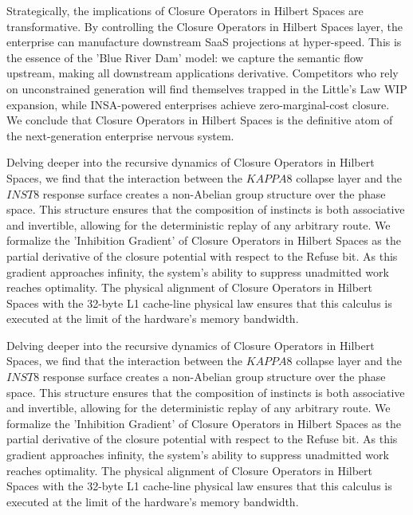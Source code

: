 \documentclass[12pt,a4paper,oneside]{book}
\begin{document}
Strategically, the implications of Closure Operators in Hilbert Spaces are transformative. By controlling the Closure Operators in Hilbert Spaces layer, the enterprise can manufacture downstream SaaS projections at hyper-speed. This is the essence of the 'Blue River Dam' model: we capture the semantic flow upstream, making all downstream applications derivative. Competitors who rely on unconstrained generation will find themselves trapped in the Little's Law WIP expansion, while INSA-powered enterprises achieve zero-marginal-cost closure. We conclude that Closure Operators in Hilbert Spaces is the definitive atom of the next-generation enterprise nervous system. 

Delving deeper into the recursive dynamics of Closure Operators in Hilbert Spaces, we find that the interaction between the $KAPPA8$ collapse layer and the $INST8$ response surface creates a non-Abelian group structure over the phase space. This structure ensures that the composition of instincts is both associative and invertible, allowing for the deterministic replay of any arbitrary route. We formalize the 'Inhibition Gradient' of Closure Operators in Hilbert Spaces as the partial derivative of the closure potential with respect to the Refuse bit. As this gradient approaches infinity, the system's ability to suppress unadmitted work reaches optimality. The physical alignment of Closure Operators in Hilbert Spaces with the 32-byte L1 cache-line physical law ensures that this calculus is executed at the limit of the hardware's memory bandwidth. 

Delving deeper into the recursive dynamics of Closure Operators in Hilbert Spaces, we find that the interaction between the $KAPPA8$ collapse layer and the $INST8$ response surface creates a non-Abelian group structure over the phase space. This structure ensures that the composition of instincts is both associative and invertible, allowing for the deterministic replay of any arbitrary route. We formalize the 'Inhibition Gradient' of Closure Operators in Hilbert Spaces as the partial derivative of the closure potential with respect to the Refuse bit. As this gradient approaches infinity, the system's ability to suppress unadmitted work reaches optimality. The physical alignment of Closure Operators in Hilbert Spaces with the 32-byte L1 cache-line physical law ensures that this calculus is executed at the limit of the hardware's memory bandwidth. 
\end{document}
